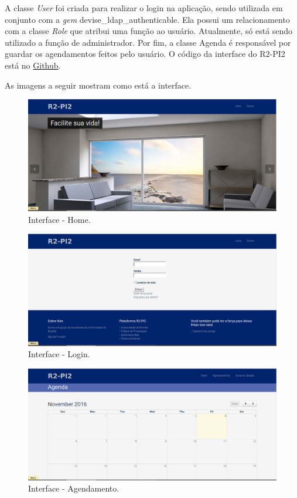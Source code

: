 A classe \textit{User} foi criada para realizar o login na aplicação, sendo utilizada em conjunto com a \textit{gem} devise\_ldap\_authenticable. Ela possui um relacionamento com a classe \textit{Role} que atribui uma função ao usuário. Atualmente, só está sendo utilizado a função de administrador. Por fim, a classe Agenda é responsável por guardar os agendamentos feitos pelo usuário. O código da interface do R2-PI2 está no \href{https://github.com/PI2Aspirador/railsApp}{Github}.

As imagens a seguir mostram como está a interface.

\begin{figure}[H]
	\centering
	\includegraphics[scale=0.3]{figuras/home_interface.png}
	\caption{Interface - Home.}
	\label{img:home}
\end{figure}

\begin{figure}[H]
	\centering
	\includegraphics[scale=0.3]{figuras/login.png}
	\caption{Interface - Login.}
	\label{img:login}
\end{figure}

\begin{figure}[H]
	\centering
	\includegraphics[scale=0.3]{figuras/agendamento.png}
	\caption{Interface - Agendamento.}
	\label{img:agendamento}
\end{figure}
